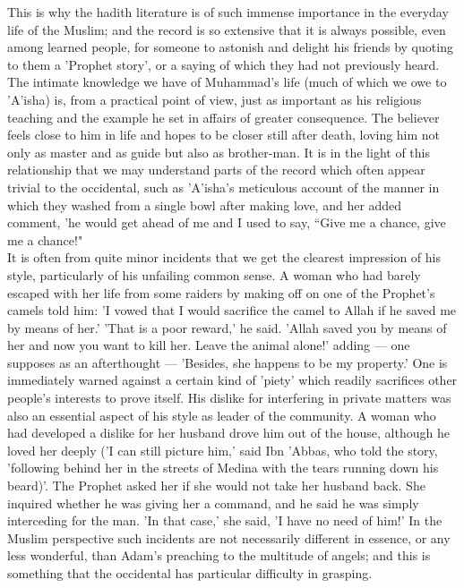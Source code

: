 \documentclass[10pt, twoside]{book}
\begin{document}
This is why the hadith literature is of such immense importance in the everyday life of the Muslim; 
and the record is so extensive that it is always possible, even among learned people, for someone to 
astonish and delight his friends by quoting to them a 'Prophet story', or a saying of which they had 
not previously heard. The intimate knowledge we have of Muhammad's life (much of which we owe to 
'A'isha) is, from a practical point of view, just as important as his religious teaching and the 
example he set in affairs of greater consequence. The believer feels close to him in life and hopes 
to be closer still after death, loving him not only as master and as guide but also as brother\hyp{}man. 
It is in the light of this relationship that we may understand parts of the record which often appear 
trivial to the occidental, such as 'A'isha's meticulous account of the manner in which they washed 
from a single bowl after making love, and her added comment, 'he would get ahead of me and I used to 
say, ``Give me a chance, give me a chance!" \\

It is often from quite minor incidents that we get the clearest impression of his style, particularly 
of his unfailing common sense. A woman who had barely escaped with her life from some raiders by 
making off on one of the Prophet's camels told him: 'I vowed that I would sacrifice the camel to 
Allah if he saved me by means of her.' 'That is a poor reward,' he said. 'Allah saved you by means of 
her and now you want to kill her. Leave the animal alone!' adding --- one supposes as an afterthought --- 
'Besides, she happens to be my property.' One is immediately warned against a certain kind of 'piety' 
which readily sacrifices other people's interests to prove itself. His dislike for interfering in 
private matters was also an essential aspect of his style as leader of the community. A woman who had 
developed a dislike for her husband drove him out of the house, although he loved her deeply ('I can 
still picture him,' said Ibn 'Abbas, who told the story, 'following behind her in the streets of 
Medina with the tears running down his beard)'. The Prophet asked her if she would not take her 
husband back. She inquired whether he was giving her a command, and he said he was simply interceding 
for the man. 'In that case,' she said, 'I have no need of him!' In the Muslim perspective such 
incidents are not necessarily different in essence, or any less wonderful, than Adam's preaching to 
the multitude of angels; and this is something that the occidental has particular difficulty in 
grasping. \\
\end{document}
